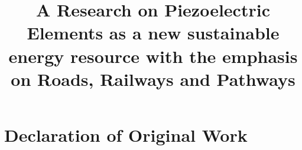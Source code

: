 \documentclass[a4paper,12pt]{report}
\title                   %
{A Research on Piezoelectric Elements as a new sustainable energy resource with the emphasis on Roads, Railways and Pathways}
\begin{document}


\tableofcontents %
\newpage %



\onehalfspacing %
\renewcommand{\chaptermark}[1]{\markboth{\MakeUppercase{\thechapter.\ #1}}{}} %
\renewcommand{\sectionmark}[1]{\markright{\thesection.\ #1}{}} %
\fancyhead[R]{\rightmark}
\fancyhead[L]{\leftmark}
\fancyhead[C]{\thepage{}} %
\fancyhead[L]{\leftmark}
\fancyhead[R]{\rightmark}
\fancyfoot{}
\pagestyle{fancy}





\cleardoublepage  %
\printindex %


\cleardoublepage %
\listoffigures %

\cleardoublepage %
\lstlistoflistings %

\cleardoublepage %
\printbibliography %



\appendix

\chapter{Declaration of Original Work}\label{ch:appendix_independencedeclaration}





\end{document}
